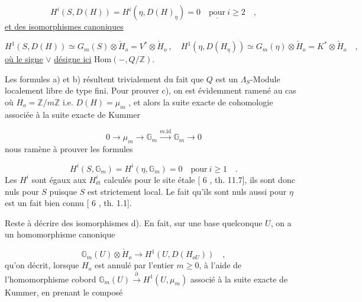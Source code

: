 \begin{equation}\tag{c)}
H^i(S,D(H)) = H^i(\eta,D(H)_\eta) = 0 \quad \underline{\text{pour}}\ i \geq 2 \quad ,
\end{equation}
\underline{et des isomorphismes canoniques}

\begin{equation}\tag{d)}
H^1(S,D(H)) \simeq G_m(S)\otimes \check{H}_o = V^*\otimes \check{H}_o \ , \quad H^1(\eta,D(H_\eta)) \simeq G_m(\eta) \otimes \check{H}_o = K^*\otimes \check{H}_o \quad ,
\end{equation}
\underline{où le signe} $\vee$ \underline{désigne ici} $\mathrm{Hom}( - , Q/\mathbb{Z} )$.

Les formules a) et b) résultent trivialement du fait que $Q$ est un $\Lambda_S$-Module localement libre de type fini. Pour prouver c), on est évidemment ramené au cas où $H_o = \mathbb{Z}/m\mathbb{Z}$ i.e. $D(H) = \mu_m$ , et alors la suite exacte de cohomologie associée à la suite exacte de Kummer

\begin{equation*}
0 \longrightarrow \mu_m \longrightarrow \mathbb{G}_m \overset{m.\mathrm{id}}{\longrightarrow} \mathbb{G}_m \longrightarrow 0
\end{equation*}
nous ramène à prouver les formules

\begin{equation*}
H^i(S,\mathbb{G}_m) = H^i(\eta,\mathbb{G}_m) = 0 \quad \text{pour}\ i \geq 1 \quad .
\end{equation*}
Les $H^i$ sont égaux aux $H^i_{\text{ét}}$ calculés pour le site étale [ 6 , th. 11.7], ils sont donc nuls pour $S$ puisque $S$ est strictement local. Le fait qu'ils sont nuls aussi pour $\eta$ est un fait bien connu [ 6 , th. 1.1].



Reste à décrire des isomorphismes d). En fait, sur une base quelconque $U$, on a un homomorphisme canonique

\begin{equation}\tag{9.4.3.1}
\mathbb{G}_m(U) \otimes \check{H}_o \longrightarrow H^1(U,D(H_{oU})) \quad ,
\end{equation}
qu'on décrit, lorsque $H_o$ est annulé par l'entier $m \geqslant 0$, à l'aide de l'homomorphisme cobord $\mathbb{G}_m(U) \stackrel{\partial}{\longrightarrow} H^1(U,\mu_m)$ associé à la suite exacte de Kummer, en prenant le composé

